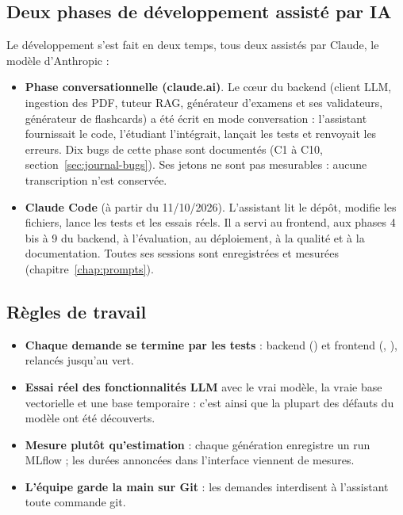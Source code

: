 \documentclass[12pt,a4paper]{report}
\DeclareRobustCommand{\code}[1]{\texttt{\codecasse{#1}}}
\begin{document}
\subsection{Deux phases de développement assisté par IA}

Le développement s'est fait en deux temps, tous deux assistés par Claude, le modèle d'Anthropic :
\begin{itemize}
  \item \textbf{Phase conversationnelle (claude.ai)}. Le cœur du backend (client LLM, ingestion des PDF,
        tuteur RAG, générateur d'examens et ses validateurs, générateur de flashcards) a été écrit en mode
        conversation : l'assistant fournissait le code, l'étudiant l'intégrait, lançait les tests et
        renvoyait les erreurs. Dix bugs de cette phase sont documentés (C1 à C10,
        section~\ref{sec:journal-bugs}). Ses jetons ne sont pas mesurables : aucune transcription n'est
        conservée.
  \item \textbf{Claude Code} (à partir du 11/10/2026). L'assistant lit le dépôt, modifie les fichiers,
        lance les tests et les essais réels. Il a servi au frontend, aux phases 4 bis à 9 du backend, à
        l'évaluation, au déploiement, à la qualité et à la documentation. Toutes ses sessions sont
        enregistrées et mesurées (chapitre~\ref{chap:prompts}).
\end{itemize}

\subsection{Règles de travail}

\begin{itemize}
  \item \textbf{Chaque demande se termine par les tests} : backend (\code{pytest}) et frontend
        (\code{ng test}, \code{ng build}), relancés jusqu'au vert.
  \item \textbf{Essai réel des fonctionnalités LLM} avec le vrai modèle, la vraie base vectorielle et une
        base temporaire : c'est ainsi que la plupart des défauts du modèle ont été découverts.
  \item \textbf{Mesure plutôt qu'estimation} : chaque génération enregistre un run MLflow ; les durées
        annoncées dans l'interface viennent de mesures.
  \item \textbf{L'équipe garde la main sur Git} : les demandes interdisent à l'assistant toute commande
        git.
\end{itemize}
\end{document}
